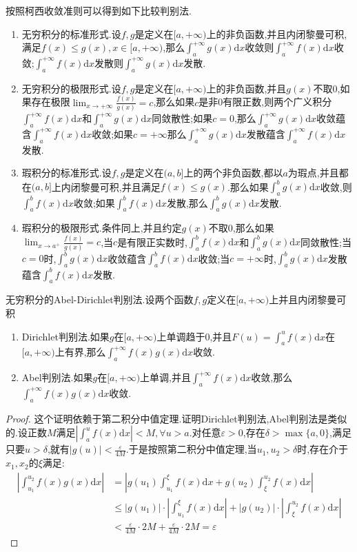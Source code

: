 按照柯西收敛准则可以得到如下比较判别法.
\begin{enumerate}
	\item 无穷积分的标准形式.设$f,g$是定义在$[a,+\infty)$上的非负函数,并且内闭黎曼可积,满足$f(x)\le g(x),x\in[a,+\infty)$,那么$\int_a^{+\infty}g(x)\mathrm{d}x$收敛则$\int_a^{+\infty}f(x)\mathrm{d}x$收敛;$\int_a^{+\infty}f(x)\mathrm{d}x$发散则$\int_a^{+\infty}g(x)\mathrm{d}x$发散.
	\item 无穷积分的极限形式.设$f,g$是定义在$[a,+\infty)$上的非负函数,并且$g(x)$不取0,如果存在极限$\lim_{x\to+\infty}\frac{f(x)}{g(x)}=c$,那么如果$c$是非0有限正数,则两个广义积分$\int_a^{+\infty}f(x)\mathrm{d}x$和$\int_a^{+\infty}g(x)\mathrm{d}x$同敛散性;如果$c=0$,那么$\int_a^{+\infty}g(x)\mathrm{d}x$收敛蕴含$\int_a^{+\infty}f(x)\mathrm{d}x$收敛;如果$c=+\infty$那么$\int_a^{+\infty}g(x)\mathrm{d}x$发散蕴含$\int_a^{+\infty}f(x)\mathrm{d}x$发散.
	\item 瑕积分的标准形式.设$f,g$是定义在$(a,b]$上的两个非负函数,都以$a$为瑕点,并且都在$(a,b]$上内闭黎曼可积,并且满足$f(x)\le g(x)$.那么如果$\int_a^bg(x)\mathrm{d}x$收敛,则$\int_a^bf(x)\mathrm{d}x$收敛;如果$\int_a^bf(x)\mathrm{d}x$发散,那么$\int_a^bg(x)\mathrm{d}x$发散.
	\item 瑕积分的极限形式.条件同上,并且约定$g(x)$不取0,那么如果$\lim_{x\to a^+}\frac{f(x)}{g(x)}=c$,当$c$是有限正实数时,$\int_a^bf(x)\mathrm{d}x$和$\int_a^bg(x)\mathrm{d}x$同敛散性;当$c=0$时,$\int_a^bg(x)\mathrm{d}x$收敛蕴含$\int_a^bf(x)\mathrm{d}x$收敛;当$c=+\infty$时,$\int_a^bg(x)\mathrm{d}x$发散蕴含$\int_a^bf(x)\mathrm{d}x$发散.
\end{enumerate}

无穷积分的Abel-Dirichlet判别法.设两个函数$f,g$定义在$[a,+\infty)$上并且内闭黎曼可积
\begin{enumerate}
	\item Dirichlet判别法.如果$g$在$[a,+\infty)$上单调趋于0,并且$F(u)=\int_a^uf(x)\mathrm{d}x$在$[a,+\infty)$上有界,那么$\int_a^{+\infty}f(x)g(x)\mathrm{d}x$收敛.
	\item Abel判别法.如果$g$在$[a,+\infty)$上单调,并且$\int_a^{+\infty}f(x)\mathrm{d}x$收敛,那么$\int_a^{+\infty}f(x)g(x)\mathrm{d}x$收敛.
\end{enumerate}
\begin{proof}
	
	这个证明依赖于第二积分中值定理.证明Dirichlet判别法,Abel判别法是类似的.设正数$M$满足$\left|\int_a^uf(x)\mathrm{d}x\right|<M,\forall u>a$.对任意$\varepsilon>0$,存在$\delta>\max\{a,0\}$,满足只要$u>\delta$,就有$|g(u)|<\frac{\varepsilon}{4M}$.于是按照第二积分中值定理,当$u_1,u_2>\delta$时,存在介于$x_1,x_2$的$\xi$满足:
	\begin{align*}
	\left|\int_{u_1}^{u_2}f(x)g(x)\mathrm{d}x\right| &=\left|g(u_1)\int_{u_1}^{\xi}f(x)\mathrm{d}x+g(u_2)\int_{\xi}^{u_2}f(x)\mathrm{d}x\right| \\
	&\le|g(u_1)|\cdot\left|\int_{u_1}^{\xi}f(x)\mathrm{d}x\right|+|g(u_2)|\cdot\left|\int_{\xi}^{u_2}f(x)\mathrm{d}x\right| \\
	&<\frac{\varepsilon}{4M}\cdot2M+\frac{\varepsilon}{4M}\cdot2M=\varepsilon
	\end{align*}
\end{proof}

